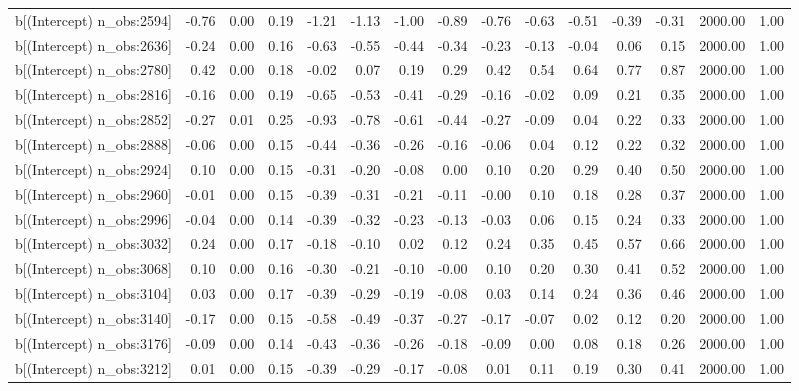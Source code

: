 \begin{table}[ht]
\begin{tabular}{rrrrrrrrrrrrrrr}
  b[(Intercept) n\_obs:2594] & -0.76 & 0.00 & 0.19 & -1.21 & -1.13 & -1.00 & -0.89 & -0.76 & -0.63 & -0.51 & -0.39 & -0.31 & 2000.00 & 1.00 \\ 
  b[(Intercept) n\_obs:2636] & -0.24 & 0.00 & 0.16 & -0.63 & -0.55 & -0.44 & -0.34 & -0.23 & -0.13 & -0.04 & 0.06 & 0.15 & 2000.00 & 1.00 \\ 
  b[(Intercept) n\_obs:2780] & 0.42 & 0.00 & 0.18 & -0.02 & 0.07 & 0.19 & 0.29 & 0.42 & 0.54 & 0.64 & 0.77 & 0.87 & 2000.00 & 1.00 \\ 
  b[(Intercept) n\_obs:2816] & -0.16 & 0.00 & 0.19 & -0.65 & -0.53 & -0.41 & -0.29 & -0.16 & -0.02 & 0.09 & 0.21 & 0.35 & 2000.00 & 1.00 \\ 
  b[(Intercept) n\_obs:2852] & -0.27 & 0.01 & 0.25 & -0.93 & -0.78 & -0.61 & -0.44 & -0.27 & -0.09 & 0.04 & 0.22 & 0.33 & 2000.00 & 1.00 \\ 
  b[(Intercept) n\_obs:2888] & -0.06 & 0.00 & 0.15 & -0.44 & -0.36 & -0.26 & -0.16 & -0.06 & 0.04 & 0.12 & 0.22 & 0.32 & 2000.00 & 1.00 \\ 
  b[(Intercept) n\_obs:2924] & 0.10 & 0.00 & 0.15 & -0.31 & -0.20 & -0.08 & 0.00 & 0.10 & 0.20 & 0.29 & 0.40 & 0.50 & 2000.00 & 1.00 \\ 
  b[(Intercept) n\_obs:2960] & -0.01 & 0.00 & 0.15 & -0.39 & -0.31 & -0.21 & -0.11 & -0.00 & 0.10 & 0.18 & 0.28 & 0.37 & 2000.00 & 1.00 \\ 
  b[(Intercept) n\_obs:2996] & -0.04 & 0.00 & 0.14 & -0.39 & -0.32 & -0.23 & -0.13 & -0.03 & 0.06 & 0.15 & 0.24 & 0.33 & 2000.00 & 1.00 \\ 
  b[(Intercept) n\_obs:3032] & 0.24 & 0.00 & 0.17 & -0.18 & -0.10 & 0.02 & 0.12 & 0.24 & 0.35 & 0.45 & 0.57 & 0.66 & 2000.00 & 1.00 \\ 
  b[(Intercept) n\_obs:3068] & 0.10 & 0.00 & 0.16 & -0.30 & -0.21 & -0.10 & -0.00 & 0.10 & 0.20 & 0.30 & 0.41 & 0.52 & 2000.00 & 1.00 \\ 
  b[(Intercept) n\_obs:3104] & 0.03 & 0.00 & 0.17 & -0.39 & -0.29 & -0.19 & -0.08 & 0.03 & 0.14 & 0.24 & 0.36 & 0.46 & 2000.00 & 1.00 \\ 
  b[(Intercept) n\_obs:3140] & -0.17 & 0.00 & 0.15 & -0.58 & -0.49 & -0.37 & -0.27 & -0.17 & -0.07 & 0.02 & 0.12 & 0.20 & 2000.00 & 1.00 \\ 
  b[(Intercept) n\_obs:3176] & -0.09 & 0.00 & 0.14 & -0.43 & -0.36 & -0.26 & -0.18 & -0.09 & 0.00 & 0.08 & 0.18 & 0.26 & 2000.00 & 1.00 \\ 
  b[(Intercept) n\_obs:3212] & 0.01 & 0.00 & 0.15 & -0.39 & -0.29 & -0.17 & -0.08 & 0.01 & 0.11 & 0.19 & 0.30 & 0.41 & 2000.00 & 1.00 \\ 

\end{tabular}
\end{table}
